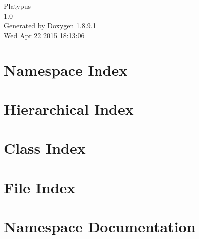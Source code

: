 \documentclass[twoside]{book}
\newcommand{\+}{\discretionary{\mbox{\scriptsize$\hookleftarrow$}}{}{}}
\newcommand{\clearemptydoublepage}{%
  \newpage{\pagestyle{empty}\cleardoublepage}%
}
\begin{document}
\hypersetup{pageanchor=false,
             bookmarks=true,
             bookmarksnumbered=true,
             pdfencoding=unicode
            }
\begin{titlepage}
\vspace*{7cm}
\begin{center}%
{\Large Platypus \\[1ex]\large 1.\+0 }\\
\vspace*{1cm}
{\large Generated by Doxygen 1.8.9.1}\\
\vspace*{0.5cm}
{\small Wed Apr 22 2015 18:13:06}\\
\end{center}
\end{titlepage}
\clearemptydoublepage
\tableofcontents
\clearemptydoublepage
{}
\hypersetup{pageanchor=true}

\chapter{Namespace Index}

\chapter{Hierarchical Index}

\chapter{Class Index}

\chapter{File Index}

\chapter{Namespace Documentation}

























\end{document}
